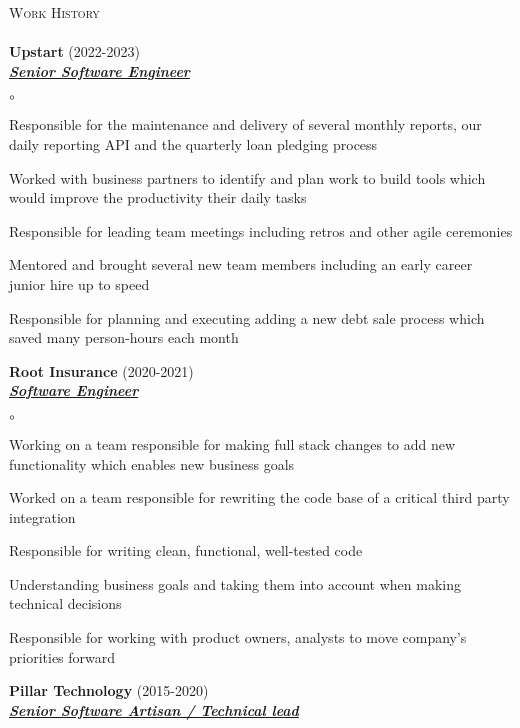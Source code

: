 \documentclass{article}
\newcommand{\lineunder}{\vspace*{-8pt} \\ \hspace*{-18pt} \hrulefill{} \\}
\newcommand{\header}[1]{{\hspace*{-15pt}\vspace*{6pt} \textsc{#1}} \vspace*{-6pt} \lineunder}
\newcommand{\employer}[3]{{ \textbf{#1} (#2)\\ \underline{\textbf{\emph{#3}}}\\  }}
\newenvironment{achievements}{\begin{list}{$\circ$}{\topsep 0pt \itemsep -2pt}}{\vspace*{4pt}\end{list}}
\begin{document}
\header{Work History}
\employer{Upstart}{2022-2023}{Senior Software Engineer}
	\begin{achievements}
	\item Responsible for the maintenance and delivery of several monthly reports, our daily reporting API and the quarterly loan pledging process
	\item Worked with business partners to identify and plan work to build tools which would improve the productivity their daily tasks
	\item Responsible for leading team meetings including retros and other agile ceremonies
	\item Mentored and brought several new team members including an early career junior hire up to speed
	\item Responsible for planning and executing adding a new debt sale process which saved many person-hours each month
	\end{achievements}
\employer{Root Insurance}{2020-2021}{Software Engineer}
	\begin{achievements}
	\item Working on a team responsible for making full stack changes to add new functionality which enables new business goals
	\item Worked on a team responsible for rewriting the code base of a critical third party integration
	\item Responsible for writing clean, functional, well-tested code
	\item Understanding business goals and taking them into account when making technical decisions
	\item Responsible for working with product owners, analysts to move company's priorities forward
	\end{achievements}
\employer{Pillar Technology}{2015-2020}{Senior Software Artisan / Technical lead}
\end{document}
